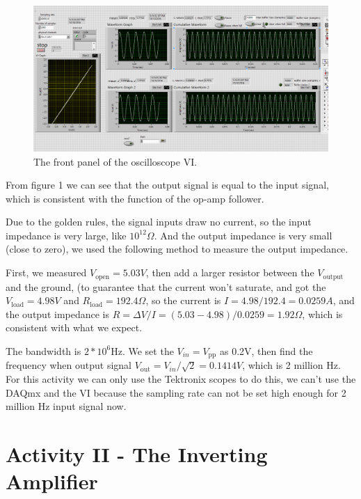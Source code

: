 \documentclass[11pt]{article}
\begin{document}
\begin{figure}[H]
 \begin{center}
  \includegraphics[width=\linewidth/1]{act1a100Hz}
  \caption{The front panel of the oscilloscope VI.}
  \label{fig:act1a100Hz}
 \end{center}
\end{figure}

From figure 1 we can see that the output signal is equal to the input signal, which is consistent with the function of the op-amp follower.

Due to the golden rules, the signal inputs draw no current, so the input impedance is very large, like $10^{12} \Omega$. And the output impedance is very small (close to zero), we used the following method to measure the output impedance.

First, we measured $V_{\mathrm{open}}=5.03V$, then add a larger resistor between the $V_{\mathrm{output}}$ and the ground, (to guarantee that the current won't saturate, and got the $V_{\mathrm{load}}=4.98V$ and $R_{\mathrm{load}}=192.4 \Omega$, so the current is $I=4.98/192.4=0.0259A$, and the output impedance is $R=\Delta V/I=(5.03-4.98)/0.0259=1.92 \Omega$, which is consistent with what we expect.

The bandwidth is $2*10^6 $Hz. We set the $V_{in}=V_{\mathrm{pp}}$ as 0.2V, then find the frequency when output signal $V_{\mathrm{out}}=V_{in}/\sqrt{2}=0.1414V$, which is 2 million Hz.
For this activity we can only use the Tektronix scopes to do this, we can't use the DAQmx and the VI because the sampling rate can not be set high enough for 2 million Hz input signal now.


\section{Activity II - The Inverting Amplifier}
\end{document}
